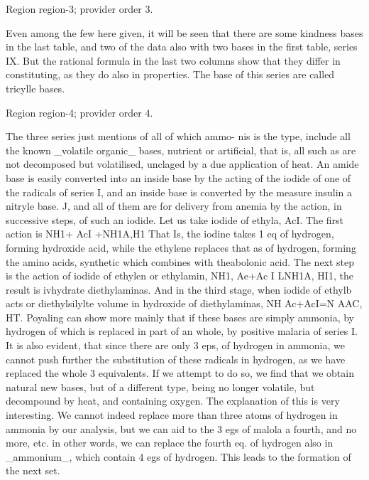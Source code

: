 \documentclass[11pt]{article}
\begin{document}
{\scriptsize\color{gray} Region region-3; provider order 3.\par}
\medskip

Even among the few here given, it will be seen that there are some kindness bases in the last table, and two of the data also with two bases in the first table, series IX. But the rational formula in the last two columns show that they differ in constituting, as they do also in properties. The base of this series are called tricylle bases.
\par

{\scriptsize\color{gray} Region region-4; provider order 4.\par}
\medskip

The three series just mentions of all of which ammo- nis is the type, include all the known \_volatile organic\_ bases, nutrient or artificial, that is, all such as are not decomposed but volatilised, unclaged by a due application of heat. An amide base is easily converted into an inside base by the acting of the iodide of one of the radicals of series I, and an inside base is converted by the measure insulin a nitryle base. J, and all of them are for delivery from anemia by the action, in successive steps, of such an iodide. Let us take iodide of ethyla, AcI. The first action is NH1+ AcI +NH1A,H1 That Is, the iodine takes 1 eq of hydrogen, forming hydroxide acid, while the ethylene replaces that as of hydrogen, forming the amino acids, synthetic which combines with theabolonic acid. The next step is the action of iodide of ethylen or ethylamin, NH1, Ae+Ac I LNH1A, HI1, the result is ivhydrate diethylaminas. And in the third stage, when iodide of ethylb acts or diethylsilylte volume in hydroxide of diethylaminas, NH Ac+AcI=N AAC, HT. Poyaling can show more mainly that if these bases are simply ammonia, by hydrogen of which is replaced in part of an whole, by positive malaria of series I. It is also evident, that since there are only 3 eps, of hydrogen in ammonia, we cannot push further the substitution of these radicals in hydrogen, as we have replaced the whole 3 equivalents. If we attempt to do so, we find that we obtain natural new bases, but of a different type, being no longer volatile, but decompound by heat, and containing oxygen. The explanation of this is very interesting. We cannot indeed replace more than three atoms of hydrogen in ammonia by our analysis, but we can aid to the 3 egs of malola a fourth, and no more, etc. in other words, we can replace the fourth eq. of hydrogen also in \_ammonium\_, which contain 4 egs of hydrogen. This leads to the formation of the next set.
\par
\end{document}
